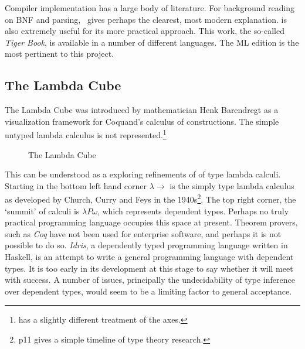 \documentclass[12pt, a4paper]{report}
\begin{document}
Compiler implementation has a large body of literature. For background reading on \gls{BNF} and
parsing,~\cite{torc} gives perhaps the clearest, most modern explanation.
\cite{Appel:1997:MCI:248430} is also extremely useful for its more practical approach. This work,
the so-called \textit{Tiger Book}, is available in a number of different languages. The ML edition is
the most pertinent to this project.

\subsection{The Lambda Cube}
The Lambda Cube was introduced by mathematician Henk Barendregt as a visualization framework for
Coquand's calculus of constructions\cite{Barendregt:1993:LCT:162552.162561}. The simple untyped lambda calculus is not
represented.\footnote{\cite{Pierce:2002:TPL:509043} has a slightly different treatment of the axes.}

\begin{figure} %
    \label{fig:cube}
    \centering
    \caption{The Lambda Cube}
\end{figure}

This can be understood as a exploring refinements of of type lambda calculi. Starting in the bottom
left hand corner $\lambda \rightarrow$ is the simply type lambda calculus as developed by Church,
Curry and Feys in the 1940s\footnote{\cite{Pierce:2002:TPL:509043} p11 gives a simple timeline
of type theory research.}. The top right corner, the `summit' of calculi is $\lambda P \omega$,
which represents \gls{dependent types}. Perhaps no truly practical programming language occupies this
space at present. Theorem provers, such as \textit{\gls{Coq}} have not been used for enterprise software,
and perhaps it is not possible to do so. \textit{Idris}, a dependently typed programming language
written in Haskell, is an attempt to write a general programming language with dependent types. It
is too early in its development at this stage to say whether it will meet with success. A number of
issues, principally the undecidability of type inference over dependent types, would seem to be a
limiting factor to general acceptance.
\end{document}
